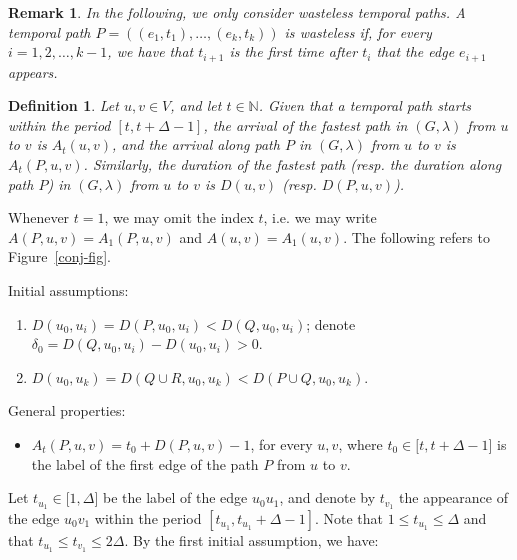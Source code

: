 \documentclass{article}
\newtheorem{definition}{Definition}
\newtheorem{remark}{Remark}
\begin{document}
\begin{remark}
In the following, we only consider \emph{wasteless} temporal paths. A
temporal path $P=((e_{1},t_{1}),\ldots ,(e_{k},t_{k}))$ is  \emph{wasteless}
if, for every $i=1,2,\ldots ,k-1$, we have that $t_{i+1}$ is the first time
after $t_{i}$ that the edge $e_{i+1}$ appears.
\end{remark}

\begin{definition}
\label{arrival-duration-def}Let $u,v\in V$, and let $t\in 
\mathbb{N}
$. Given that a temporal path starts within the period $[t,t+\Delta -1]$,
the \emph{arrival} of the fastest path in $(G,\lambda )$ from $u$ to $v$ is $%
A_{t}(u,v)$, and the \emph{arrival} along path $P$ in $(G,\lambda )$ from $u$
to $v$ is $A_{t}(P,u,v)$. Similarly, the \emph{duration} of the fastest path
(resp. the \emph{duration} along path $P$) in $(G,\lambda )$ from $u$ to $v$
is $D(u,v)$ (resp. $D(P,u,v)$).
\end{definition}

Whenever $t=1$, we may omit the index $t$, i.e. we may write $%
A(P,u,v)=A_{1}(P,u,v)$ and $A(u,v)=A_{1}(u,v)$. The following refers to
Figure~\ref{conj-fig}.

Initial assumptions:

\begin{enumerate}
\item $D(u_{0},u_{i})=D(P,u_{0},u_{i})<D(Q,u_{0},u_{i})$; denote $\delta
_{0}=D(Q,u_{0},u_{i})-D(u_{0},u_{i})>0$.

\item $D(u_{0},u_{k})=D(Q\cup R,u_{0},u_{k})<D(P\cup Q,u_{0},u_{k})$.
\end{enumerate}

General properties:

\begin{itemize}
\item $A_{t}(P,u,v)=t_{0}+D(P,u,v)-1$, for every $u,v$, where $t_{0}\in
\lbrack t,t+\Delta -1]$ is the label of the first edge of the path $P$ from $%
u$ to $v$.
\end{itemize}

\bigskip

Let $t_{u_{1}}\in \lbrack 1,\Delta ]$ be the label of the edge $u_{0}u_{1}$,
and denote by $t_{v_{1}}$ the appearance of the edge $u_{0}v_{1}$ within the
period $[t_{u_{1}},t_{u_{1}}+\Delta -1]$. Note that $1\leq t_{u_{1}}\leq
\Delta $ and that $t_{u_{1}}\leq t_{v_{1}}\leq 2\Delta $. By the first
initial assumption, we have:
\end{document}
